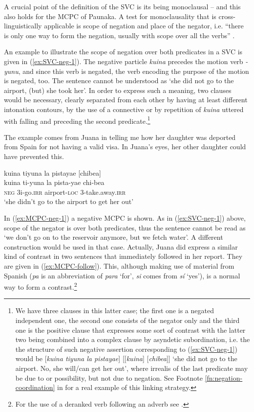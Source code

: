A crucial point of the definition of the SVC is its being monoclausal – and this also holds for the MCPC of Paunaka. A test for monoclausality that is cross-linguistically applicable is scope of negation and place of the negator, i.e. “there is only one way to form the negation, usually with scope over all the verbs” \citep[299]{Haspelmath2016}. 

An example to illustrate the scope of negation over both predicates in a SVC is given in (\ref{ex:SVC-neg-1}). The negative particle \textit{kuina} precedes the motion verb \textit{-yunu}, and since this verb is negated, the verb encoding the purpose of the motion is negated, too. The sentence cannot be understood as ‘she did not go to the airport, (but) she took her’. In order to express such a meaning, two clauses would be necessary, clearly separated from each other by having at least different intonation contours, by the use of a connective or by repetition of \textit{kuina} uttered with falling  and preceding the second predicate.\footnote{We have three clauses in this latter case; the first one is a negated independent one, the second one consists of the negator only and the third one is the positive clause that expresses some sort of contrast with the latter two being combined into a complex clause by asyndetic subordination, i.e. the the structure of such negative assertion corresponding to (\ref{ex:SVC-neg-1}) would be [\textit{kuina tiyuna la pistayae}] [[\textit{kuina}] [\textit{chibea}]] ‘she did not go to the airport. No, she will/can get her out’, where irrealis of the last predicate may be due to  or possibility, but not due to negation. See Footnote \ref{fn:negation-coordination} in  for a real example of this linking strategy.}

The example comes from Juana in telling me how her daughter was deported from Spain for not having a valid visa. In Juana’s eyes, her other daughter could have prevented this.

\ea\label{ex:SVC-neg-1}
\begingl
\glpreamble kuina tiyuna la pistayae \textup{[}chibea\textup{]}\\
\gla kuina ti-yuna {la pista}-yae chi-bea\\
\glb \textsc{neg} 3i-go.\textsc{irr} {airport}-\textsc{loc} 3-take.away.\textsc{irr}\\
\glft ‘she didn’t go to the airport to get her out’
\endgl
\trailingcitation{[jxx-p110923l-1.296]}
\xe

In (\ref{ex:MCPC-neg-1}) a negative MCPC is shown. As in (\ref{ex:SVC-neg-1}) above, scope of the negator is over both predicates, thus the sentence cannot be read as ‘we don’t go on to the reservoir anymore, but we fetch water’. A different construction would be used in that case. Actually, Juana did express a similar kind of contrast in two sentences that immediately followed in her report. They are given in (\ref{ex:MCPC-follow}). This, although making use of material from Spanish (\textit{pa} is an abbreviation of \textit{para} ‘for’, \textit{si} comes from \textit{sí} ‘yes’), is a normal way to form a contrast.\footnote{For the use of a deranked verb following an adverb see .}


